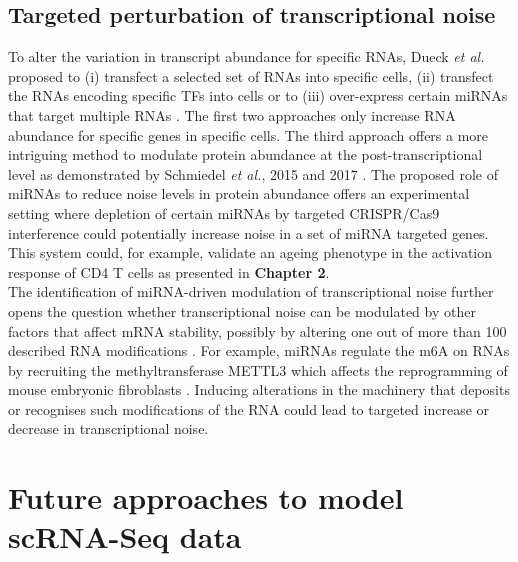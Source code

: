 \subsection{Targeted perturbation of transcriptional noise} 

To alter the variation in transcript abundance for specific RNAs, Dueck \emph{et al.} proposed to (i) transfect a selected set of RNAs into specific cells, (ii) transfect the RNAs encoding specific TFs into cells or to (iii) over-express certain miRNAs that target multiple RNAs \cite{Dueck2016}. 
The first two approaches only increase RNA abundance for specific genes in specific cells. 
The third approach offers a more intriguing method to modulate protein abundance at the post-transcriptional level as demonstrated by Schmiedel \emph{et al.}, 2015 and 2017 \cite{Schmiedel2015, Schmiedel2017}. 
The proposed role of miRNAs to reduce noise levels in protein abundance offers an experimental setting where depletion of certain miRNAs by targeted CRISPR/Cas9 interference could potentially increase noise in a set of miRNA targeted genes. 
This system could, for example, validate an ageing phenotype in the activation response of CD4\plus{} T cells as presented in \textbf{Chapter 2}. \\

The identification of miRNA-driven modulation of transcriptional noise further opens the question whether transcriptional noise can be modulated by other factors that affect mRNA stability, possibly by altering one out of more than 100 described RNA modifications \citep{Cantara2011}. 
For example, miRNAs regulate the \gls{m6A} on RNAs by recruiting the methyltransferase METTL3 which affects the reprogramming of mouse embryonic fibroblasts \citep{Chen2015b}. 
Inducing alterations in the machinery that deposits or recognises such modifications of the RNA could lead to targeted increase or decrease in transcriptional noise.

\newpage

\section{Future approaches to model scRNA-Seq data}

